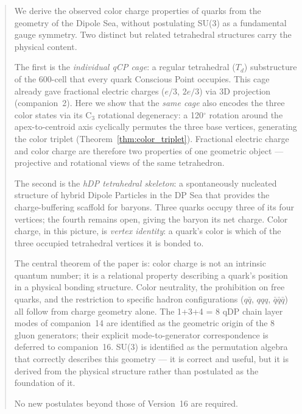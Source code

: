\documentclass[12pt]{article}
\begin{document}
\begin{abstract}
We derive the observed color charge properties of quarks from the
geometry of the Dipole Sea, without postulating SU(3) as a fundamental
gauge symmetry.  Two distinct but related tetrahedral structures carry
the physical content.

The first is the \emph{individual qCP cage}: a regular tetrahedral
($T_d$) substructure of the 600-cell that every quark Conscious Point
occupies.  This cage already gave fractional electric charges
($e/3$, $2e/3$) via 3D projection (companion~2).  Here we show that
the \emph{same cage} also encodes the three color states via its C$_3$
rotational degeneracy: a 120$^\circ$ rotation around the
apex-to-centroid axis cyclically permutes the three base vertices,
generating the color triplet (Theorem~\ref{thm:color_triplet}).
Fractional electric charge and color charge are therefore two
properties of one geometric object — projective and rotational views
of the same tetrahedron.

The second is the \emph{hDP tetrahedral skeleton}: a spontaneously
nucleated structure of hybrid Dipole Particles in the DP Sea that
provides the charge-buffering scaffold for baryons.  Three quarks
occupy three of its four vertices; the fourth remains open, giving
the baryon its net charge.  Color charge, in this picture, is
\emph{vertex identity}: a quark's color is which of the three
occupied tetrahedral vertices it is bonded to.

The central theorem of the paper is: color charge is not an intrinsic
quantum number; it is a relational property describing a quark's
position in a physical bonding structure.  Color neutrality, the
prohibition on free quarks, and the restriction to specific hadron
configurations ($q\bar{q}$, $qqq$, $\bar{q}\bar{q}\bar{q}$) all
follow from charge geometry alone.  The 1+3+4 = 8 qDP chain layer
modes of companion~14 are identified as the geometric origin of the
8 gluon generators; their explicit mode-to-generator correspondence
is deferred to companion~16.  SU(3) is identified as the permutation
algebra that correctly describes this geometry --- it is correct and
useful, but it is derived from the physical structure rather than
postulated as the foundation of it.

No new postulates beyond those of Version~16 are required.
\end{abstract}

\end{document}
